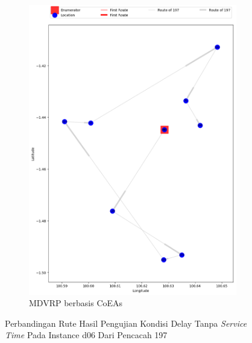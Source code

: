 \begin{figure}[H]
	\centering
	\begin{subfigure}[t]{\textwidth}
		\centering
		\includegraphics[width=\textwidth]{Resources/Images/delayed_6/real_m15_n100_delayed_6_197_coes}
		\caption{MDVRP berbasis CoEAs}
		\label{fig:real_m15_n100_delayed_6_197_coes}
	\end{subfigure}
	\caption{Perbandingan Rute Hasil Pengujian Kondisi Delay Tanpa \textit{Service Time} Pada Instance d06 Dari Pencacah 197}
	\label{fig:real_m15_n100_delayed_6_197}
\end{figure}


